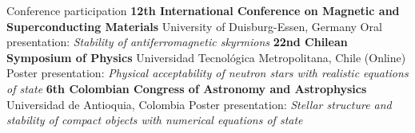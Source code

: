 \begin{rubric}{Conference participation}
\textbf{12th International Conference on Magnetic and Superconducting Materials} \newline
University of Duisburg-Essen, Germany \newline
Oral presentation: \emph{Stability of antiferromagnetic skyrmions}
\textbf{22nd Chilean Symposium of Physics} \newline
Universidad Tecnológica Metropolitana, Chile (Online) \newline
Poster presentation: \emph{Physical acceptability of neutron stars with realistic equations of state}
%
\textbf{6th Colombian Congress of Astronomy and Astrophysics} \newline
Universidad de Antioquia, Colombia \newline
Poster presentation: \emph{Stellar structure and stability of compact objects with numerical equations of state}
\end{rubric}